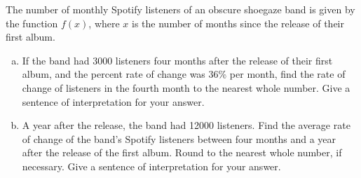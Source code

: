 \documentclass[notes]{subfiles}
\begin{document}
		\begin{ex}
			The number of monthly Spotify listeners of an obscure shoegaze band is given by the function $f(x)$, where $x$ is the number of months since the release of their first album. 
			\begin{enumerate}[(a)]
				\item If the band had 3000 listeners four months after the release of their first album, and the percent rate of change was 36\% per month, find the rate of change of listeners in the fourth month to the nearest whole number.  Give a sentence of interpretation for your answer.
					
				\item A year after the release, the band had 12000 listeners.  Find the average rate of change of the band's Spotify listeners between four months and a year after the release of the first album.  Round to the nearest whole number, if necessary.  Give a sentence of interpretation for your answer.
			\end{enumerate}
		\end{ex}
			\newpage
			
\end{document}
